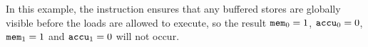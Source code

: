 \begin{table}[!hbt]
\noindent{}
\caption{Global Visibility \cite[Example 9]{ref:AMD}}
\label{tbl:litmus:amd:9}
\end{table}

\noindent
In this example, the  instruction ensures that any buffered stores are globally visible before the loads are allowed to execute, so the result $\texttt{mem}_0 = 1$, $\texttt{accu}_0 = 0$, $\texttt{mem}_1 = 1$ and $\texttt{accu}_1 = 0$ will not occur.
